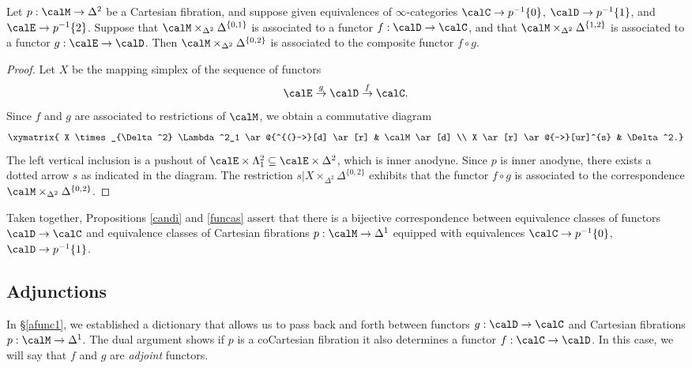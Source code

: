 \begin{proposition}\label{compass}
Let $p: \calM \rightarrow \Delta^2$ be a Cartesian fibration, and suppose given equivalences
of $\infty$-categories $\calC \rightarrow p^{-1} \{0\}$, $\calD \rightarrow p^{-1} \{1\}$, and
$\calE \rightarrow p^{-1} \{2\}$. Suppose that $\calM \times_{\Delta^2} \Delta^{ \{0,1\} }$
is associated to a functor $f: \calD \rightarrow \calC$, and that $\calM \times_{ \Delta^2} \Delta^{ \{1,2\} }$ is associated to a functor $g: \calE \rightarrow \calD$. Then $\calM \times_{\Delta^2} \Delta^{ \{0,2\} }$ is associated to the composite functor $f \circ g$.
\end{proposition}

\begin{proof}
Let $X$ be the mapping simplex of the sequence of functors
$$ \calE \stackrel{g}{\rightarrow} \calD \stackrel{f}{\rightarrow} \calC.$$
Since $f$ and $g$ are associated to restrictions of $\calM$, we obtain a commutative diagram
$$ \xymatrix{ X \times_{\Delta^2} \Lambda^2_1 \ar@{^{(}->}[d] \ar[r] & \calM \ar[d] \\
X \ar[r] \ar@{-->}[ur]^{s} & \Delta^2.}$$
The left vertical inclusion is a pushout of $\calE \times \Lambda^2_1 \subseteq \calE \times \Delta^2$, which is inner anodyne. Since $p$ is inner anodyne, there exists a dotted arrow $s$ as indicated in the diagram. The restriction $s| X \times_{\Delta^2} \Delta^{ \{0,2\}}$ exhibits
that the functor $f \circ g$ is associated to the correspondence $\calM \times_{\Delta^2} \Delta^{ \{0,2\}}$.
\end{proof}

\begin{remark}
Taken together, Propositions \ref{candi} and \ref{funcas} assert that there is a bijective correspondence between equivalence classes of functors $\calD \rightarrow \calC$
and equivalence classes of Cartesian fibrations $p: \calM \rightarrow \Delta^1$ equipped with
equivalences $\calC \rightarrow p^{-1} \{0\}$, $\calD \rightarrow p^{-1} \{1\}$.
\end{remark}

\subsection{Adjunctions}\label{afunc2}

In \S \ref{afunc1}, we established a dictionary that allows us to pass back and forth between functors
$g: \calD \rightarrow \calC$ and Cartesian fibrations $p: \calM \rightarrow \Delta^1$. The dual argument shows if $p$ is a coCartesian fibration it also determines a functor
$f: \calC \rightarrow \calD$. In this case, we will say that $f$ and $g$ are {\em adjoint} functors.

